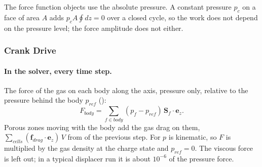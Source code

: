 The force function objects use the absolute pressure. A constant pressure $p_c$ on a face of area $A$ adds $p_c A \oint dz = 0$ over a closed cycle, so the work does not depend on the pressure level; the force amplitude does not either.

\subsubsection{Crank Drive}
\paragraph{In the solver, every time step.}
The force of the gas on each body along the axis, pressure only, relative to the pressure behind the body $p_{ref}$ ():
\begin{equation}
F_{body} = \sum_{f \in body} (p_f - p_{ref})\,\mathbf{S}_f \cdot \mathbf{e}_z .
\end{equation}
Porous zones moving with the body add the gas drag on them, $\sum_{cells} (\mathbf{f}_{drag}\cdot\mathbf{e}_z)\,V$ from  of the previous step. For  $p$ is kinematic, so $F$ is multiplied by the gas density at the charge state and $p_{ref} = 0$. The viscous force is left out; in a typical displacer run it is about $10^{-6}$ of the pressure force.

